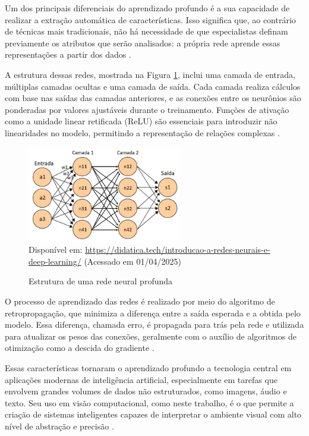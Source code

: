 Um dos principais diferenciais do aprendizado profundo é a sua capacidade de realizar a extração automática de características. Isso significa que, ao contrário de técnicas mais tradicionais, não há necessidade de que especialistas definam previamente os atributos que serão analisados: a própria rede aprende essas representações a partir dos dados \cite{Agarwal2021-deeplearning}.

A estrutura dessas redes, mostrada na Figura \ref{fg0}, inclui uma camada de entrada, múltiplas camadas ocultas e uma camada de saída. Cada camada realiza cálculos com base nas saídas das camadas anteriores, e as conexões entre os neurônios são ponderadas por valores ajustáveis durante o treinamento. Funções de ativação como a unidade linear retificada (ReLU) são essenciais para introduzir não linearidades no modelo, permitindo a representação de relações complexas \cite{gu2018}.

\begin{figure}[htbp]
  \centering
  \caption{Estrutura de uma rede neural profunda}
  \includegraphics[width=0.6\textwidth]{Figuras/Est-rede-neural-profunda.png}
  \\
  Disponível em: \url{https://didatica.tech/introducao-a-redes-neurais-e-deep-learning/} (Acessado em 01/04/2025)
  \label{fg0}
\end{figure}

O processo de aprendizado das redes é realizado por meio do algoritmo de retropropagação, que minimiza a diferença entre a saída esperada e a obtida pelo modelo. Essa diferença, chamada erro, é propagada para trás pela rede e utilizada para atualizar os pesos das conexões, geralmente com o auxílio de algoritmos de otimização como a descida do gradiente \cite{goodfellow2016}.

Essas características tornaram o aprendizado profundo a tecnologia central em aplicações modernas de inteligência artificial, especialmente em tarefas que envolvem grandes volumes de dados não estruturados, como imagens, áudio e texto. Seu uso em visão computacional, como neste trabalho, é o que permite a criação de sistemas inteligentes capazes de interpretar o ambiente visual com alto nível de abstração e precisão \cite{hassaballah2020}.

